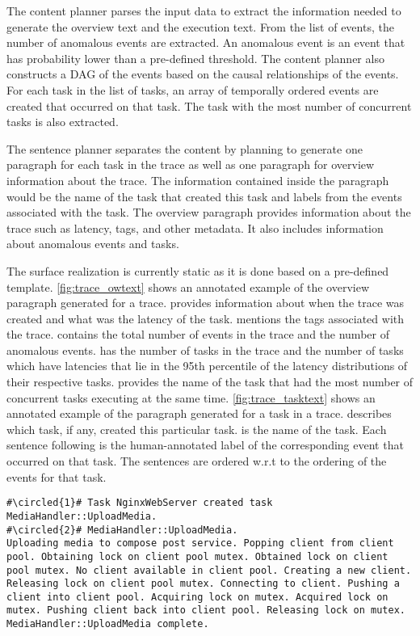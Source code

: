  The content planner parses the input data to extract the information
needed to generate the overview text and the execution text. From the list of events, the number
of anomalous events are extracted. An anomalous event is an event that has probability lower
than a pre-defined threshold. The content planner also constructs a DAG
of the events based on the causal relationships of the events. For each task in the list of tasks,
an array of temporally ordered events are created that occurred on that task. The task with the most number of
concurrent tasks is also extracted.

 The sentence planner separates the content by planning to generate one paragraph
for each task in the trace as well as one paragraph for overview information about the trace.
The information contained inside the paragraph would be the name of the task that created this task
and labels from the events associated with the task.
The overview paragraph provides information about the trace such as latency, tags, and other metadata.
It also includes information about anomalous events and tasks.

 The surface realization is currently static as it is done based on
a pre-defined template. \autoref{fig:trace_owtext} shows an annotated example of the overview paragraph generated for a trace.
 provides information about when the trace was created and what was the latency of the task.
 mentions the tags associated with the trace.
 contains the total number of events in the trace and the number of anomalous events. 
 has the number of tasks in the trace and the number of tasks which have latencies that lie in the 95th percentile of the latency distributions
of their respective tasks. 
 provides the name of the task that had the most number of concurrent tasks executing at the same time.
\autoref{fig:trace_tasktext} shows an annotated example of the paragraph generated for a task in a trace.
 describes which task, if any, created this particular task.
 is the name of the task.
Each sentence following  is the human-annotated label of the corresponding event that occurred on that task.
The sentences are ordered w.r.t to the ordering of the events for that task.

\begin{lstlisting}[caption={Annotated paragraph generated for a task in a trace},captionpos=b,label={fig:trace_tasktext}, escapechar=\#]
#\circled{1}# Task NginxWebServer created task MediaHandler::UploadMedia. 
#\circled{2}# MediaHandler::UploadMedia. 
Uploading media to compose post service. Popping client from client pool. Obtaining lock on client pool mutex. Obtained lock on client pool mutex. No client available in client pool. Creating a new client. Releasing lock on client pool mutex. Connecting to client. Pushing a client into client pool. Acquiring lock on mutex. Acquired lock on mutex. Pushing client back into client pool. Releasing lock on mutex. MediaHandler::UploadMedia complete. 
\end{lstlisting}

